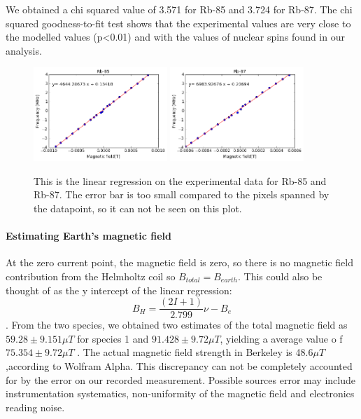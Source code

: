 \documentclass{sigchi}
\begin{document}
We obtained a chi squared value of 3.571 for Rb-85 and 3.724 for Rb-87. The chi squared goodness-to-fit test shows that the experimental values are very close to the modelled values (p<0.01) and with the values of nuclear spins found in our analysis.
\begin{figure}[h]
\includegraphics[width=0.45\textwidth]{plots/rb85.png}
\includegraphics[width=0.45\textwidth]{plots/rb87.png}
\caption{This is the linear regression on the experimental data for Rb-85 and Rb-87. The error bar is too small compared to the pixels spanned by the datapoint, so it can not be seen on this plot.}
\label{linear_fit}
\end{figure}
\paragraph{Estimating Earth's magnetic field}
\par At the zero current point, the magnetic field is zero, so there is no magnetic field contribution from the Helmholtz coil so $B_{total} = B_{earth}$. This could also be thought of as the y intercept of the linear regression: 
$$ B_H = \frac{(2I+1)}{2.799} \nu - B_e $$.
From the two species, we obtained two estimates of the total magnetic field as $59.28\pm 9.151 \mu T $ for species 1 and $91.428  \pm 9.72 \mu T$, yielding a average value o f$75.354\pm 9.72 \mu T $ . The actual magnetic field strength in Berkeley is 48.6$\mu T$,according to Wolfram Alpha. This discrepancy can not be completely accounted for by the error on our recorded measurement. Possible sources error may include instrumentation systematics, non-uniformity of the magnetic field and electronics reading noise. 
\end{document}
